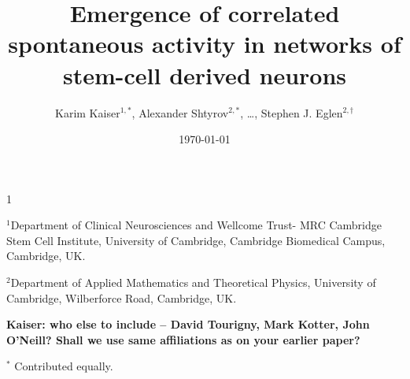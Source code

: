 1\documentclass[11pt]{article}
\begin{document}
\doublespacing



\renewcommand{\um}{\,\ensuremath{\upmu \text{m}}\xspace}
\providecommand{\mm}{}
\renewcommand{\mm}{\,mm\xspace}
\newcommand{\moire}{Moir\'{e}\xspace}
\newcommand{\td}{\ensuremath{\mu_2}\xspace}
\newcommand{\dtheta}{\ensuremath{\Delta \theta}\xspace}
\newcommand{\dnn}{\ensuremath{D}\xspace}
\newcommand{\ournote}[1]{\marginpar{\textbf{#1}}}
\renewcommand{\ournote}[1]{}

\newcommand{\thref}[1]{\ref{#1}\marginpar{{\footnotesize
      {Table~\ref{#1} here}}}}
\newcommand{\fhref}[1]{\ref{#1}\marginpar{{\footnotesize
      {Fig.~\ref{#1} here}}}}

\newcommand{\ig}[1]{\centering\fbox{\texttt{[image: \#1]}}}
\renewcommand{\ig}[1]{}
\providecommand*{\ped}[1]{\ensuremath{_\mathrm{#1}}}
\newcommand{\thetitle}{Emergence of correlated spontaneous activity in
  networks of stem-cell derived neurons}
\title{\thetitle}



\author{Karim Kaiser$^{1,\ast}$, Alexander Shtyrov$^{2,\ast}$,
  \ldots,
  Stephen J. Eglen$^{2,\dagger}$}
\date{\today}
\maketitle


\noindent $^{1}$Department of Clinical Neurosciences and Wellcome
Trust- MRC Cambridge Stem Cell Institute, University of Cambridge,
Cambridge Biomedical Campus, Cambridge, UK.

\noindent $^{2}$Department of Applied Mathematics and Theoretical Physics,
University of Cambridge, Wilberforce Road, Cambridge, UK.


\textbf{Kaiser: who else to include -- David Tourigny, Mark Kotter,
  John O'Neill?  Shall we use same affiliations as on your earlier
  paper? \cite{Tourigny2019-lk}}

\vspace*{2mm}


\noindent $^\ast$ Contributed equally.
\end{document}
